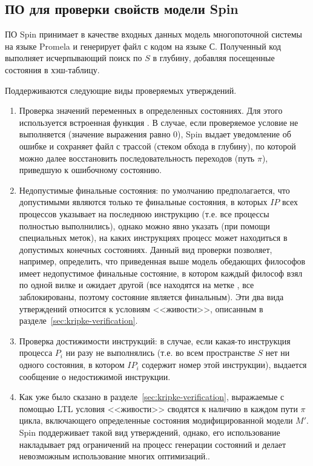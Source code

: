 \subsection{ПО для проверки свойств модели Spin}
\label{sec:spin}

ПО Spin принимает в качестве входных данных модель многопоточной системы на языке Promela
и генерирует файл с кодом на языке С. Полученный код выполняет исчерпывающий поиск по $S$
в глубину, добавляя посещенные состояния в хэш-таблицу.

Поддерживаются следующие виды проверяемых утверждений. 

\begin{enumerate}
\item Проверка значений переменных в определенных состояниях. Для этого используется
  встроенная функция . В случае, если проверяемое условие не выполняется
  (значение выражения равно 0), Spin выдает уведомление об ошибке и сохраняет файл с
  трассой (стеком обхода в глубину), по которой можно далее восстановить
  последовательность переходов (путь $\pi$), приведшую к ошибочному состоянию.

\item Недопустимые финальные состояния: по умолчанию предполагается, что допустимыми
  являются только те финальные состояния, в которых $IP$ всех процессов указывает на
  последнюю инструкцию (т.е. все процессы полностью выполнились), однако можно явно
  указать (при помощи специальных меток), на каких инструкциях процесс может находиться в
  допустимых конечных состояниях. Данный вид проверки позволяет, например, определить, что
  приведенная выше модель обедающих философов имеет недопустимое финальные состояние, в
  котором каждый философ взял по одной вилке и ожидает другой (все находятся на метке
  , все заблокированы, поэтому состояние является финальным). Эти два вида
  утверждений относится к условиям <<живости>>, описанным в
  разделе~\ref{sec:kripke-verification}.

\item Проверка достижимости инструкций: в случае, если какая-то инструкция процесса $P_i$
  ни разу не выполнялись (т.е. во всем пространстве $S$ нет ни одного состояния, в котором
  $IP_i$ содержит номер этой инструкции), выдается сообщение о недостижимой инструкции.

\item Как уже было сказано в разделе~\ref{sec:kripke-verification}, выражаемые с помощью
  LTL условия <<живости>> сводятся к наличию в каждом пути $\pi$ цикла, включающего
  определенные состояния модифицированной модели $M'$. Spin поддерживает такой вид
  утверждений, однако, его использование накладывает ряд ограничений на процесс генерации
  состояний и делает невозможным использование многих оптимизаций.\cite{SpinRoot}.
\end{enumerate}

